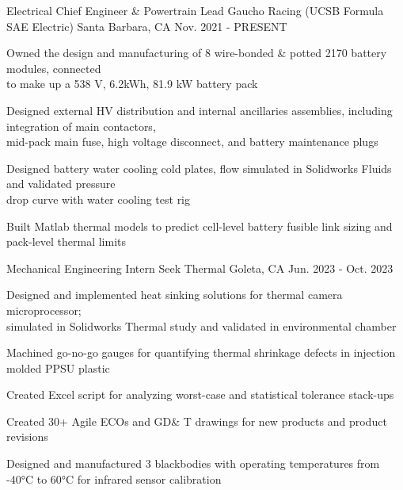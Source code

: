 \begin{cventries}
\cventry
{Electrical Chief Engineer \& Powertrain Lead} %
{Gaucho Racing (UCSB Formula SAE Electric)} %
{Santa Barbara, CA} %
{Nov. 2021 - PRESENT} %
{ %
\begin{cvitems}   
\item {Owned the design and manufacturing of 8 wire-bonded \& potted 2170 battery modules, connected \\ to make up a 538 V, 6.2kWh, 81.9 kW battery pack}
\item {Designed external HV distribution and internal ancillaries assemblies, including integration of main contactors, \\mid-pack main fuse,  high voltage disconnect, and battery maintenance plugs}
\item {Designed battery water cooling cold plates, flow simulated in Solidworks Fluids and validated pressure \\ drop curve with water cooling test rig}
\item {Built Matlab thermal models to predict cell-level battery fusible link sizing and pack-level thermal limits }
\end{cvitems}
}
\cventry
{Mechanical Engineering Intern} %
{Seek Thermal} %
{Goleta, CA} %
{Jun. 2023 - Oct. 2023} %
{ %
\begin{cvitems}
\item{Designed and implemented heat sinking solutions for thermal camera microprocessor; \\ simulated in Solidworks Thermal study and validated in environmental chamber}
\item{Machined go-no-go gauges for quantifying thermal shrinkage defects in injection molded PPSU plastic}
\item{Created Excel script for analyzing worst-case and statistical tolerance stack-ups}
\item{Created 30+ Agile ECOs and GD\& T drawings for new products and product revisions}
\item{Designed and manufactured 3 blackbodies with operating temperatures from -40°C to 60°C for infrared sensor calibration}
\end{cvitems}
}


\end{cventries}
